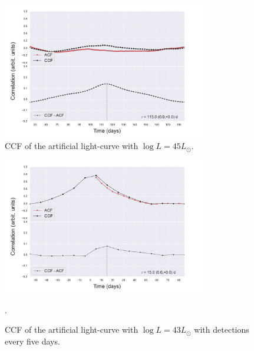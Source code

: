 \documentclass[letterpaper, oneside]{article}
\begin{document}
\begin{figure}[h]
	\centering
	\includegraphics[width=0.8\textwidth]{../CCF_plots/x_y_bands_45_final.pdf}
	\caption{CCF of the artificial light-curve with $\log L = 45 L_{\odot}$.}
	\label{fig:ccf_art_lcs_L45}
\end{figure}


\begin{figure}[h]
	\centering
	\includegraphics[width=0.8\textwidth]{../CCF_plots/artificial_x_y_5days.pdf}
	\caption{CCF of the artificial light-curve with $\log L = 43 L_{\odot}$ with detections every five days.}.
	\label{fig:ccf_art_lc_L43_5days}
\end{figure}
\end{document}
